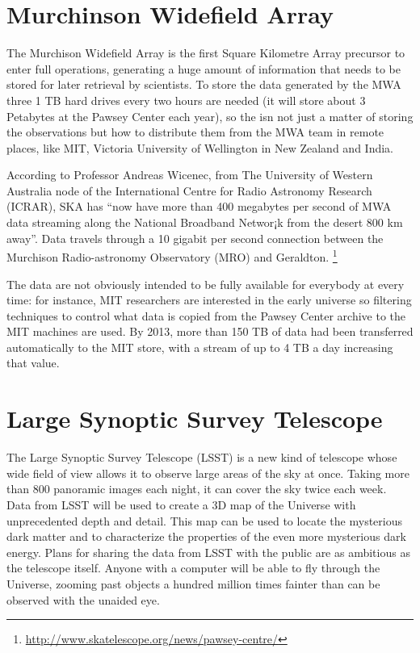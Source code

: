 \section{Murchinson Widefield Array}


The Murchison Widefield Array is the first Square Kilometre Array precursor to enter full operations, generating a huge amount of information that needs to be stored for later retrieval by scientists. To store the data generated by the MWA three 1 TB hard drives every two hours are needed (it will store about 3 Petabytes at the Pawsey Center each year), so the isn not just a matter of storing the observations but how to distribute them from the MWA team in remote places, like MIT, Victoria University of Wellington in New Zealand and India. \newline

According to Professor Andreas Wicenec, from The University of Western Australia node of the International Centre for Radio Astronomy Research (ICRAR), SKA has ``now have more than 400 megabytes per second of MWA data streaming along the National Broadband Networ¡k from the desert 800 km away''. Data travels through a 10 gigabit per second connection between the Murchison Radio-astronomy Observatory (MRO) and Geraldton. \footnote{\url{http://www.skatelescope.org/news/pawsey-centre/}}

The data are not obviously intended to be fully available for everybody at every time: for instance, MIT researchers are interested in the early universe so filtering techniques to control what data is copied from the Pawsey Center archive to the MIT machines are used. By 2013, more than 150 TB of data had been transferred automatically to the MIT store, with a stream of up to 4 TB a day increasing that value. \newline




\section{Large Synoptic Survey Telescope}

The Large Synoptic Survey Telescope (LSST) is a new kind of telescope whose wide field of view allows it to observe large areas of the sky at once. Taking more than 800 panoramic images each night, it can cover the sky twice each week. Data from LSST will be used to create a 3D map of the Universe with unprecedented depth and detail. This map can be used to locate the mysterious dark matter and to characterize the properties of the even more mysterious dark energy. Plans for sharing the data from LSST with the public are as ambitious as the telescope itself. Anyone with a computer will be able to fly through the Universe, zooming past objects a hundred million times fainter than can be observed with the unaided eye. \newline

